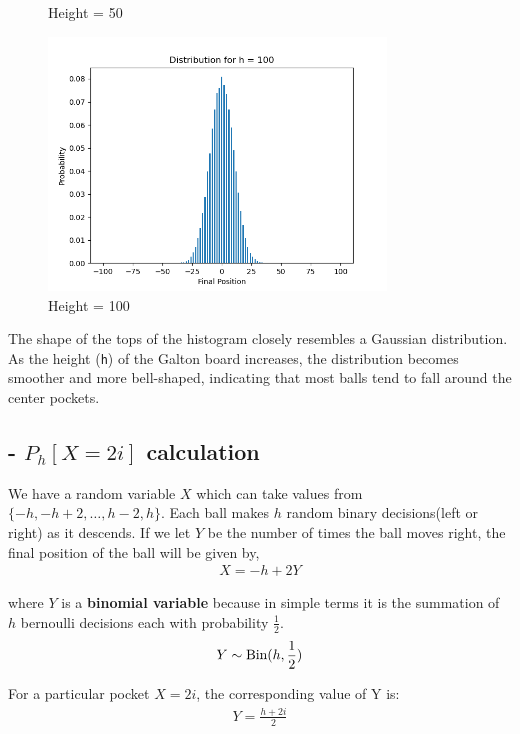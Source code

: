 \begin{solution}
\begin{figure}[H]
\begin{minipage}{0.5\textwidth}
			\caption{Height = 50}
		\end{minipage}\hfill
	\end{figure}
	\begin{figure}[H]
		\centering
		\includegraphics[width=0.8\textwidth]{../images/2d3.png}
		\caption{Height = 100}		
	\end{figure}

	The shape of the tops of the histogram closely resembles a Gaussian distribution. As the height (\texttt{h}) of the Galton board increases, the distribution becomes smoother and more bell-shaped, indicating that most balls tend to fall around the center pockets.

	\subsection*{- $P_h[X=2i]$ calculation}
	We have a random variable $X$ which can take values from
	$\{-h,-h+2,\ldots,h-2,h\}$. Each ball makes $h$ random binary
	decisions(left or right) as it descends. If we let $Y$ be the number of
	times the ball moves right, the final position of the ball will be
	given by,
	\begin{align}
		X = -h+2Y
	\end{align}

	where $Y$ is a \textbf{binomial variable} because in simple terms it is the summation of $h$ bernoulli decisions each with probability $\frac{1}{2}$.
	\begin{align}
		Y \sim \text{Bin}(h,\frac{1}{2})
	\end{align}

	For a particular pocket $X = 2i$, the corresponding value of Y is:
	\begin{align}
		Y = \frac{h+2i}{2}
	\end{align}


\end{solution}

